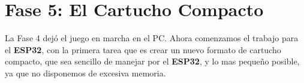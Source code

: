 \section{Fase 5: El Cartucho Compacto}
\label{sec:FaseCinco}

La Fase 4 dejó el juego en marcha en el PC. Ahora comenzamos el trabajo para el \textbf{ESP32}, con la primera tarea que es crear un nuevo formato de cartucho compacto, que sea sencillo de manejar por el \textbf{ESP32}, y lo mas pequeño posible, ya que no disponemos de excesiva memoria. 

